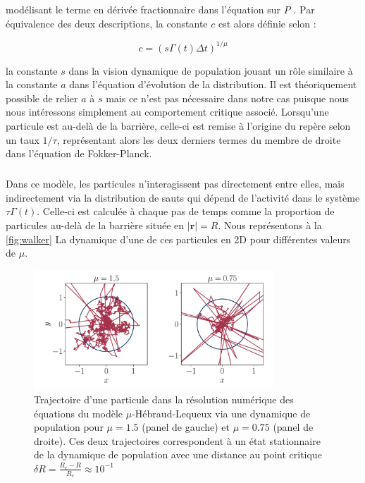 \noindent modélisant le terme en dérivée fractionnaire dans l'équation sur $P$ \cite{hinrichsen_non_equilibrium_2007, jespersen_levy_1999}. Par équivalence des deux descriptions, la constante $c$ est alors définie selon :

\begin{equation}
	c = \left( s \Gamma(t) \Delta t \right)^{1/\mu}
\end{equation}

\noindent la constante $s$ dans la vision dynamique de population jouant un rôle similaire à la constante $a$ dans l'équation d'évolution de la distribution. Il est théoriquement possible de relier $a$ à $s$ mais ce n'est pas nécessaire dans notre cas puisque nous nous intéressons simplement au comportement critique associé. Lorsqu'une particule est au-delà de la barrière, celle-ci est remise à l'origine du repère selon un taux $1/\tau$, représentant alors les deux derniers termes du membre de droite dans l'équation de Fokker-Planck.

\subparagraph{}Dans ce modèle, les particules n'interagissent pas directement entre elles, mais indirectement via la distribution de sauts qui dépend de l'activité dans le système $\tau\Gamma (t)$. Celle-ci est calculée à chaque pas de temps comme la proportion de particules au-delà de la barrière située en $|\mathbf{r}|=R$. Nous représentons à la \autoref{fig:walker} La dynamique d'une de ces particules en 2D pour différentes valeurs de $\mu$.

\begin{figure}[h]
	\centering
	\includegraphics[width= 0.8\textwidth]{walker.pdf}
	\caption{Trajectoire d'une particule dans la résolution numérique des équations du modèle $\mu$-Hébraud-Lequeux via une dynamique de population pour $\mu = 1.5$ (panel de gauche) et $\mu = 0.75$ (panel de droite). Ces deux trajectoires correspondent à un état stationnaire de la dynamique de population avec une distance au point critique $\delta R = \frac{R_c-R}{R_c}\approx 10^{-1}$}
	 \label{fig:walker}
\end{figure}

